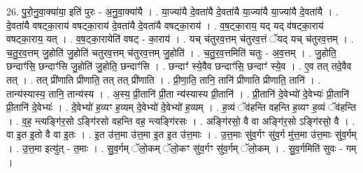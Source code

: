 \documentclass[17pt]{extarticle}
\begin{document}
26. पु॒रो॒नु॒वा॒क्या॑या॒ इति॑ पुरः - अ॒नु॒वा॒क्या॑यै । . या॒ज्या॑यै दे॒वता॑यै दे॒वता॑यै या॒ज्या॑यै या॒ज्या॑यै दे॒वता॑यै । . दे॒वता॑यै वषट्का॒राय॑ वषट्का॒राय॑ दे॒वता॑यै दे॒वता॑यै वषट्का॒राय॑ । . व॒ष॒ट्का॒राय॒ यद् यद् व॑षट्का॒राय॑ वषट्का॒राय॒ यत् । . व॒ष॒ट्का॒रायेति॑ वषट् - का॒राय॑ । . यच् च॑तुरव॒त्तम् च॑तुरव॒त्तं ॅयद् यच् च॑तुरव॒त्तम् । . च॒तु॒र॒व॒त्तम् जु॒होति॑ जु॒होति॑ चतुरव॒त्तम् च॑तुरव॒त्तम् जु॒होति॑ । . च॒तु॒र॒व॒त्तमिति॑ चतुः - अ॒व॒त्तम् । . जु॒होति॒ छन्दाꣳ॑सि॒ छन्दाꣳ॑सि जु॒होति॑ जु॒होति॒ छन्दाꣳ॑सि । . छन्दाꣳ॑ स्ये॒वैव छन्दाꣳ॑सि॒ छन्दाꣳ॑ स्ये॒व । . ए॒व तत् तदे॒वैव तत् । . तत् प्री॑णाति प्रीणाति॒ तत् तत् प्री॑णाति । . प्री॒णा॒ति॒ तानि॒ तानि॑ प्रीणाति प्रीणाति॒ तानि॑ । . तान्य॑स्यास्य॒ तानि॒ तान्य॑स्य । . अ॒स्य॒ प्री॒तानि॑ प्री॒ता न्य॑स्यास्य प्री॒तानि॑ । . प्री॒तानि॑ दे॒वेभ्यो॑ दे॒वेभ्यः॑ प्री॒तानि॑ प्री॒तानि॑ दे॒वेभ्यः॑ । . दे॒वेभ्यो॑ ह॒व्यꣳ ह॒व्यम् दे॒वेभ्यो॑ दे॒वेभ्यो॑ ह॒व्यम् । . ह॒व्यं ॅव॑हन्ति वहन्ति ह॒व्यꣳ ह॒व्यं ॅव॑हन्ति । . व॒ह॒ न्त्यङ्गि॑र॒सो ऽङ्गि॑रसो वहन्ति वह॒ न्त्यङ्गि॑रसः । . अङ्गि॑रसो॒ वै वा अङ्गि॑र॒सो ऽङ्गि॑रसो॒ वै । . वा इ॒त इ॒तो वै वा इ॒तः । . इ॒त उ॑त्त॒मा उ॑त्त॒मा इ॒त इ॒त उ॑त्त॒माः । . उ॒त्त॒माः सु॑व॒र्गꣳ सु॑व॒र्ग मु॑त्त॒मा उ॑त्त॒माः सु॑व॒र्गम् । . उ॒त्त॒मा इत्यु॑त् - त॒माः । . सु॒व॒र्गम् ॅलो॒कम् ॅलो॒कꣳ सु॑व॒र्गꣳ सु॑व॒र्गम् ॅलो॒कम् । . सु॒व॒र्गमिति॑ सुवः - गम् । \newline
\end{document}
